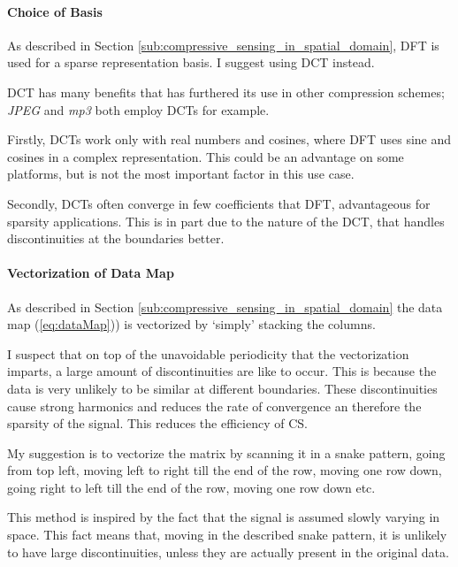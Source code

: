 \documentclass[Main]{subfiles}
\begin{document}
			\paragraph{Choice of Basis} %
			\label{par:choice_of_basis}
			
				As described in Section \ref{sub:compressive_sensing_in_spatial_domain}, DFT is used for a sparse representation basis.
				I suggest using DCT instead.

				DCT has many benefits that has furthered its use in other compression schemes; \emph{JPEG} and \emph{mp3} both employ DCTs for example.

				Firstly, DCTs work only with real numbers and cosines, where DFT uses sine and cosines in a complex representation. This could be an advantage on some platforms, but is not the most important factor in this use case.

				Secondly, DCTs often converge in few coefficients that DFT, advantageous for sparsity applications.
				This is in part due to the nature of the DCT, that handles discontinuities at the boundaries better.


			\paragraph{Vectorization of Data Map} %
			\label{par:vectorization_of_data_map}

				As described in Section \ref{sub:compressive_sensing_in_spatial_domain} the data map (\ref{eq:dataMap})) is vectorized by `simply' stacking the columns.

				I suspect that on top of the unavoidable periodicity that the vectorization imparts, a large amount of discontinuities are like to occur.
				This is because the data is very unlikely to be similar at different boundaries.
				These discontinuities cause strong harmonics and reduces the rate of convergence an therefore the sparsity of the signal.
				This reduces the efficiency of CS.

				My suggestion is to vectorize the matrix by scanning it in a snake pattern, going from top left, moving left to right till the end of the row, moving one row down, going right to left till the end of the row, moving one row down etc.

				This method is inspired by the fact that the signal is assumed slowly varying in space.
				This fact means that, moving in the described snake pattern, it is unlikely to have large discontinuities, unless they are actually present in the original data.

		


\end{document}

